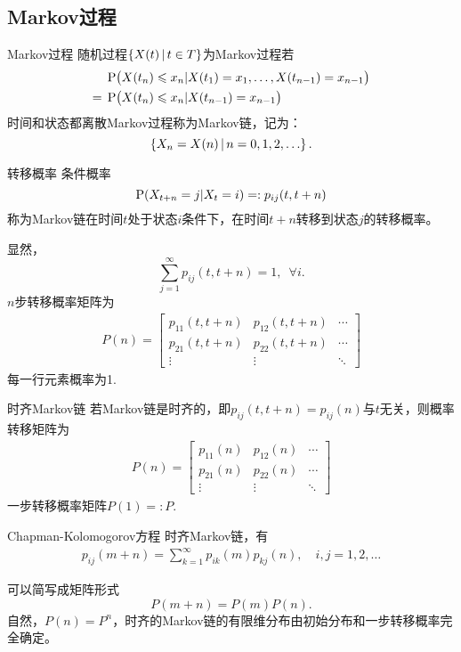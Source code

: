 \subsection{Markov过程}
\begin{definition}{Markov过程}{}
	随机过程$\set{X(t)}{t\in T}$为Markov过程若%
	\begin{align*}
		&\P\bigkh{X(t_n)\leqslant x_n|X(t_1)=x_1,\ldots,X(t_{n-1})=x_{n-1}}\\
		={}&\P\bigkh{X(t_n)\leqslant x_n|X(t_{n-1})=x_{n-1}}
	\end{align*}
	时间和状态都离散Markov过程称为Markov链，记为：
	\[
		\set{X_n=X(n)}{n=0,1,2,\ldots}.
	\]
\end{definition}
\begin{definition}{转移概率}{}
	条件概率 
	\[
		\P(X_{t+n}=j|X_t=i)=:p_{ij}(t,t+n)
	\]
	称为Markov链在时间$t$处于状态$i$条件下，在时间$t+n$转移到状态$j$的转移概率。
\end{definition}
显然，
\[
	\sum_{j=1}^\infty p_{ij}(t,t+n)=1,\enspace\forall i.
\]
$n$步转移概率矩阵为
\begin{align}
	P(n)=\begin{bmatrix}
		p_{11}(t,t+n)&p_{12}(t,t+n)&\cdots\\
		p_{21}(t,t+n)&p_{22}(t,t+n)&\cdots\\
		\vdots&\vdots&\ddots
	\end{bmatrix}
\end{align}
每一行元素概率为1.
\begin{definition}{时齐Markov链}{}
	若Markov链是时齐的，即$p_{ij}(t,t+n)=p_{ij}(n)$与$t$无关，则概率转移矩阵为
	\begin{align*}
		P(n)=\begin{bmatrix}
			p_{11}(n)&p_{12}(n)&\cdots\\
			p_{21}(n)&p_{22}(n)&\cdots\\
			\vdots&\vdots&\ddots
		\end{bmatrix}
	\end{align*}
	一步转移概率矩阵$P(1)=:P.$
\end{definition}
\begin{theorem}{Chapman-Kolomogorov方程}{}
	时齐Markov链，有
	\begin{align*}
		p_{ij}(m+n)=\sum_{k=1}^\infty p_{ik}(m)p_{kj}(n),\quad i,j=1,2,\ldots
	\end{align*}
\end{theorem}
可以简写成矩阵形式
\[
	P(m+n)=P(m)P(n).
\]
自然，$P(n)=P^n$，时齐的Markov链的有限维分布由初始分布和一步转移概率完全确定。
